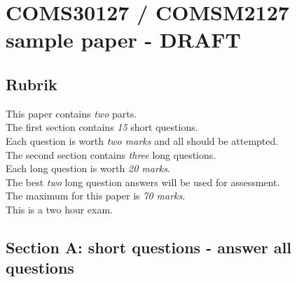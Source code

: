 \documentclass[a4paper,12pt]{article}
\begin{document}
\section*{COMS30127 / COMSM2127 sample paper - DRAFT}

\subsection*{Rubrik}
This paper contains \emph{two} parts. \\
The first section contains \emph {15} short questions.\\ 
Each question is worth \emph{two marks} and all should be attempted.\\
The second section contains \emph {three} long questions.\\
Each long question is worth \emph{20 marks}.\\
The best \emph{two} long question answers will be used for assessment. \\
The maximum for this paper is \emph{70 marks}.\\
This is a two hour exam. 

\subsection*{Section A: short questions - answer all questions}
\end{document}
